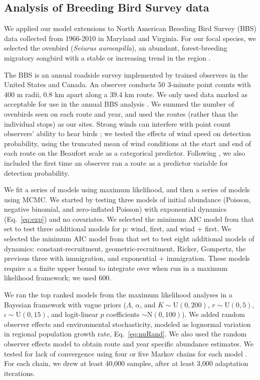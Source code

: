 \documentclass[12pt,english]{article}
\begin{document}
\begin{spacing}{1.9}
\begin{flushleft}
\subsection*{Analysis of Breeding Bird Survey data}

We applied our model extensions to North American Breeding Bird Survey
(BBS) data collected from 1966-2010 in 
Maryland and Virginia. For our focal species, we selected the
ovenbird (\textit{Seiurus aurocapilla}), an abundant, 
forest-breeding migratory songbird with a stable or increasing trend
in the region \citep{porneluzi_etal:2011}. 

The BBS is an annual roadside survey implemented by trained
observers in the United States and Canada. An observer conducts 50
3-minute point counts with 400 m radii, 0.8 km apart 
along a
39.4 km route. We only used data marked as acceptable for use in the annual BBS
analysis \citep{sauer_etal:1994auk}.  We summed the number of ovenbirds
seen on each route and year, and used the routes (rather
than the individual stops) as our sites.
Strong winds can interfere with point count observers' ability
to hear birds \citep{simons_etal:2007}; we tested the effects of wind
speed on detection probability, using the truncated mean of wind conditions at the start and end of
each route on the Beaufort scale as a categorical predictor. 
Following \citet{link_sauer:2002},
we also included the first time an observer ran a route as a predictor variable for detection
probability.
 
We fit a series of models using maximum likelihood, 
and then a series of models using MCMC. We started by testing
three models of initial abundance (Poisson, negative binomial, and
zero-inflated Poisson) with exponential dynamics
(Eq.~\ref{eq:exp}) and no covariates.  We selected the minimum AIC model from that set to test three additional
models for p: wind, first, and wind + first. We selected the minimum
AIC model from that set to test eight additional models of dynamics:
constant-recruitment, geometric-recruitment, Ricker, Gompertz, 
the previous three with immigration, and exponential + immigration.
These models require a a finite upper bound to integrate
over when run in a maximum likelihood
framework; we used 600. 

We ran the top ranked models from the maximum likelihood
analyses in a Bayesian framework with vague  
priors ($\Lambda$,
$\alpha$, and $K  \sim \mathrm{U}(0, 200)$, $r  \sim \mathrm{U}(0, 5)$,
$\iota  \sim \mathrm{U}(0, 15)$, and logit-linear $p$ coefficients $\sim \mathrm{N}(0, 100)$).  
We added random observer 
effects and environmental stochasticity, modeled as lognormal
variation in regional population growth rate, Eq.~\ref{eq:nuRand}.
We also used the random observer effects model to obtain route and 
year specific abundance estimates.    
We tested for lack of convergence using four or
five Markov chains for each model \citep{gelman_rubin:1992}.
For each chain, we drew at least 40,000 samples, 
after at least 3,000 adaptation iterations.   


\end{flushleft}
\end{spacing}
\end{document}

